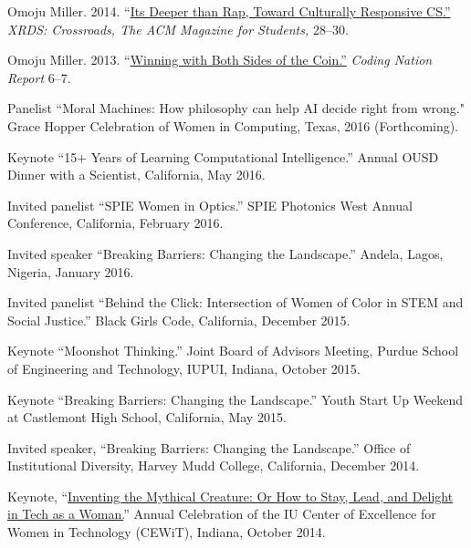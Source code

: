 \documentclass[11pt,article,oneside]{memoir}
\begin{document}
\ind Omoju Miller. 2014. ``\href{http://dl.acm.org/citation.cfm?id=2604994}{Its Deeper than Rap, Toward Culturally Responsive CS.'' }\emph{XRDS: Crossroads,  The ACM Magazine for Students, } 28--30. 

\ind Omoju Miller. 2013. ``\href{http://kaporcenter.org/wp-content/uploads/2013/10/Kapor_CodingLandscape_R3.pdf}{Winning with Both Sides of the Coin.''} \emph{Coding Nation Report} 6--7. 
 
 \bigskip


\medskip

\ind Panelist ``Moral Machines: How philosophy can help AI decide right from wrong." Grace Hopper Celebration of Women in Computing, Texas, 2016 (Forthcoming).

\ind Keynote ``15+ Years of Learning Computational Intelligence.'' Annual OUSD Dinner with a Scientist, California, May 2016. 

\ind Invited panelist ``SPIE Women in Optics.'' SPIE Photonics West Annual Conference, California, February 2016. 

\ind Invited speaker ``Breaking Barriers: Changing the Landscape.'' Andela, Lagos, Nigeria, January 2016. 

\ind Invited panelist ``Behind the Click: Intersection of Women of Color in STEM and Social Justice.'' Black Girls Code, California, December 2015.

\ind Keynote ``Moonshot Thinking.'' Joint Board of Advisors Meeting, Purdue School of Engineering and Technology, IUPUI, Indiana, October 2015.

\ind Keynote ``Breaking Barriers: Changing the Landscape.'' Youth Start Up Weekend at Castlemont High School, California, May 2015. 

\ind Invited speaker, ``Breaking Barriers: Changing the Landscape.'' Office of Institutional Diversity, Harvey Mudd College, California, December 2014. 

\ind Keynote, ``\href{https://www.youtube.com/watch?v=owXez6sIRbY&ab_channel=IUCEWIT}{Inventing the Mythical Creature: Or How to Stay, Lead, and Delight in Tech as a Woman.}'' Annual Celebration of the IU Center of Excellence for Women in Technology (CEWiT), Indiana, October 2014.
\end{document}
